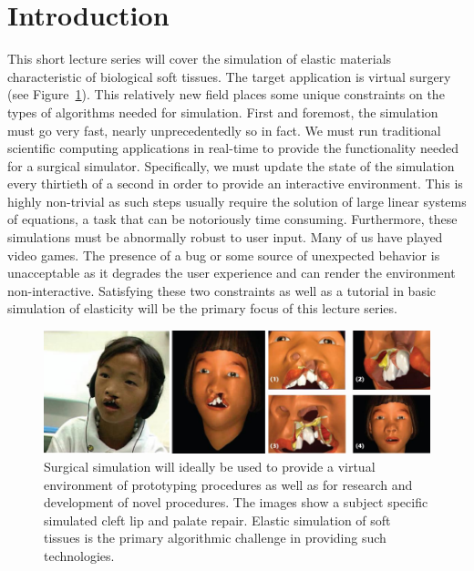 \section*{Introduction}

This short lecture series will cover the simulation of elastic materials characteristic of biological soft tissues. The target application is virtual surgery (see Figure~\ref{fig:cleft_lip}). This relatively new field places some unique constraints on the types of algorithms needed for simulation. First and foremost, the simulation must go very fast, nearly unprecedentedly so in fact. We must run traditional scientific computing applications in real-time to provide the functionality needed for a surgical simulator. Specifically, we must update the state of the simulation every thirtieth of a second in order to provide an interactive environment. This is highly non-trivial as such steps usually require the solution of large linear systems of equations, a task that can be notoriously time consuming. Furthermore, these simulations must be abnormally robust to user input. Many of us have played video games. The presence of a bug or some source of unexpected behavior is unacceptable as it degrades the user experience and can render the environment non-interactive. Satisfying these two constraints as well as a tutorial in basic simulation of elasticity will be the primary focus of this lecture series.

\begin{figure}
\includegraphics[width=\textwidth]{images/cleft_lip_image}
\caption{Surgical simulation will ideally be used to provide a virtual environment of prototyping procedures as well as for research and development of novel procedures. The images show a subject specific simulated cleft lip and palate repair. Elastic simulation of soft tissues is the primary algorithmic challenge in providing such technologies.}
\label{fig:cleft_lip}
\end{figure}

